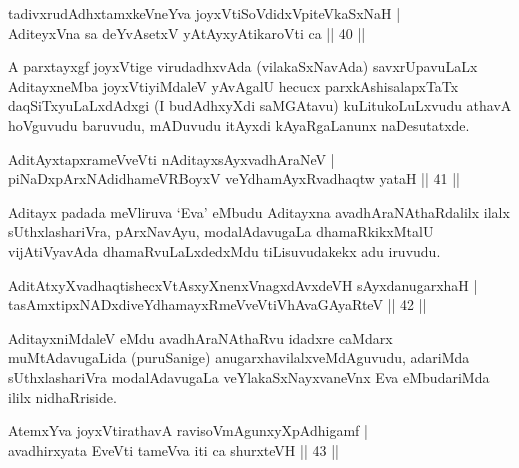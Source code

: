 \begin{shl}
tadivxrudAdhxtamxkeVneYva joyxVtiSoVdidxVpiteVkaSxNaH |\\
AditeyxVna sa deYvA\s setxV yAtAyxyAtikaroVti ca \hfill||  40 ||  
\end{shl}

\begin{artha}
A parxtayxgf joyxVtige virudadhxvAda (vilakaSxNavAda) savxrUpavuLaLx AditayxneMba joyxVtiyiMdaleV yAvAgalU hecucx parxkAshisalapxTaTx daqSiTxyuLaLxdAdxgi (I budAdhxyXdi saMGAtavu) kuLitukoLuLxvudu athavA hoVguvudu baruvudu, mADuvudu itAyxdi kAyaRgaLanunx naDesutatxde.
\end{artha}


\begin{shl}
AditAyxtapxrameVveVti nA\s \s ditayxsAyxvadhAraNeV | \\
piNaDxpArxNAdidhameVRBoyxV veYdhamAyxRvadhaqtw yataH \hfill||  41 ||  
\end{shl}

\begin{artha}
Aditayx padada meVliruva `Eva' eMbudu Aditayxna avadhAraNAthaRdalilx ilalx sUthxlashariVra, pArxNavAyu, modalAdavugaLa dhamaRkikxMtalU vijAtiVyavAda dhamaRvuLaLxdedxMdu tiLisuvudakekx adu iruvudu.
\end{artha}

\begin{shl}
AditAtxyXvadhaqtishecxVtAsxyXnenxVnagxdAvxdeVH sAyxdanugarxhaH | \\
tasAmxtipxNADxdiveYdhamayxRmeVveVtiVhAvaGAyaRteV \hfill||  42 ||  
\end{shl}

\begin{artha}
AditayxniMdaleV eMdu avadhAraNAthaRvu idadxre caMdarx muMtAdavugaLida (puruSanige) anugarxhavilalxveMdAguvudu, adariMda sUthxlashariVra modalAdavugaLa veYlakaSxNayxvaneVnx Eva eMbudariMda ililx nidhaRriside.
\end{artha}


\begin{shl}
AtemxYva joyxVtirathavA ravisoVmAgunxyXpAdhigamf | \\
avadhirxyata EveVti tameVva iti ca shurxteVH \hfill||  43 ||  
\end{shl}


